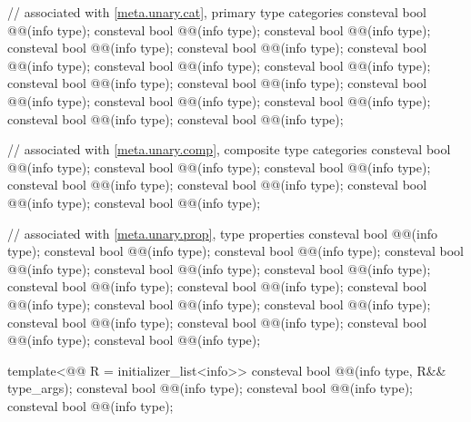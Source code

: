 \begin{codeblock}
// associated with \ref{meta.unary.cat}, primary type categories
consteval bool @@(info type);
consteval bool @@(info type);
consteval bool @@(info type);
consteval bool @@(info type);
consteval bool @@(info type);
consteval bool @@(info type);
consteval bool @@(info type);
consteval bool @@(info type);
consteval bool @@(info type);
consteval bool @@(info type);
consteval bool @@(info type);
consteval bool @@(info type);
consteval bool @@(info type);
consteval bool @@(info type);
consteval bool @@(info type);

// associated with \ref{meta.unary.comp}, composite type categories
consteval bool @@(info type);
consteval bool @@(info type);
consteval bool @@(info type);
consteval bool @@(info type);
consteval bool @@(info type);
consteval bool @@(info type);
consteval bool @@(info type);

// associated with \ref{meta.unary.prop}, type properties
consteval bool @@(info type);
consteval bool @@(info type);
consteval bool @@(info type);
consteval bool @@(info type);
consteval bool @@(info type);
consteval bool @@(info type);
consteval bool @@(info type);
consteval bool @@(info type);
consteval bool @@(info type);
consteval bool @@(info type);
consteval bool @@(info type);
consteval bool @@(info type);
consteval bool @@(info type);
consteval bool @@(info type);
consteval bool @@(info type);

template<@@ R = initializer_list<info>>
  consteval bool @@(info type, R&& type_args);
consteval bool @@(info type);
consteval bool @@(info type);
consteval bool @@(info type);


\end{codeblock}
